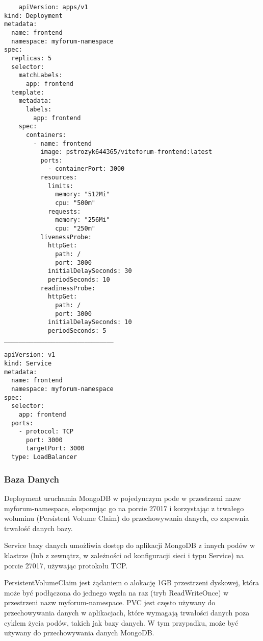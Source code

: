 \documentclass[12pt,a4paper]{article}
\begin{document}
\begin{verbatim}
    apiVersion: apps/v1
kind: Deployment
metadata:
  name: frontend
  namespace: myforum-namespace
spec:
  replicas: 5
  selector:
    matchLabels:
      app: frontend
  template:
    metadata:
      labels:
        app: frontend
    spec:
      containers:
        - name: frontend
          image: pstrozyk644365/viteforum-frontend:latest
          ports:
            - containerPort: 3000
          resources:
            limits:
              memory: "512Mi"
              cpu: "500m"
            requests:
              memory: "256Mi"
              cpu: "250m"
          livenessProbe:
            httpGet:
              path: /
              port: 3000
            initialDelaySeconds: 30
            periodSeconds: 10
          readinessProbe:
            httpGet:
              path: /
              port: 3000
            initialDelaySeconds: 10
            periodSeconds: 5
______________________________
\end{verbatim}

\begin{verbatim}
apiVersion: v1
kind: Service
metadata:
  name: frontend
  namespace: myforum-namespace
spec:
  selector:
    app: frontend
  ports:
    - protocol: TCP
      port: 3000
      targetPort: 3000
  type: LoadBalancer
\end{verbatim}

\subsubsection{Baza Danych}

Deployment uruchamia MongoDB w pojedynczym pode w przestrzeni nazw myforum-namespace, eksponując go na porcie 27017 i korzystając z trwałego woluminu (Persistent Volume Claim) do przechowywania danych, co zapewnia trwałość danych bazy.

Service bazy danych umożliwia dostęp do aplikacji MongoDB z innych podów w klastrze (lub z zewnątrz, w zależności od konfiguracji sieci i typu Service) na porcie 27017, używając protokołu TCP.

PersistentVolumeClaim jest żądaniem o alokację 1GB przestrzeni dyskowej, która może być podłączona do jednego węzła na raz (tryb ReadWriteOnce) w przestrzeni nazw myforum-namespace. PVC jest często używany do przechowywania danych w aplikacjach, które wymagają trwałości danych poza cyklem życia podów, takich jak bazy danych. W tym przypadku, może być używany do przechowywania danych MongoDB.
\end{document}
